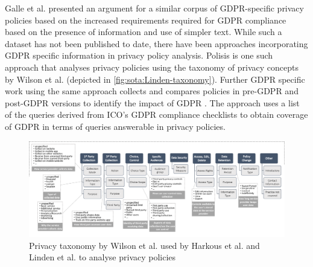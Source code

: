 Galle et al. \cite{galle_case_2019} presented an argument for a similar corpus of GDPR-specific privacy policies based on the increased requirements required for GDPR compliance based on the presence of information and use of simpler text. While such a dataset has not been published to date, there have been approaches incorporating GDPR specific information in privacy policy analysis.
Polisis \cite{harkous_polisis:_2018} is one such approach that analyses privacy policies using the taxonomy of privacy concepts by Wilson et al. \cite{wilson_creation_2016} (depicted in \autoref{fig:sota:Linden-taxonomy}).
Further GDPR specific work using the same approach collects and compares policies in pre-GDPR and post-GDPR versions to identify the impact of GDPR \cite{linden_privacy_2018}. The approach uses a list of the queries derived from ICO’s GDPR compliance checklists to obtain coverage of GDPR in terms of queries answerable in privacy policies.
\begin{figure}[htbp]
    \centering
    \includegraphics[width=\linewidth]{img/Linden_taxonomy.png}
    \caption{Privacy taxonomy by Wilson et al. \cite{wilson_creation_2016} used by Harkous et al. \cite{harkous_polisis:_2018} and Linden et al.  \cite{linden_privacy_2018} to analyse privacy policies}
    \label{fig:sota:Linden-taxonomy}
\end{figure}

